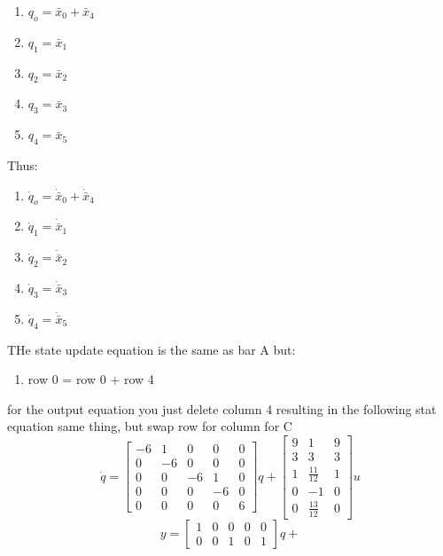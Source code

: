 \begin{enumerate}
\begin{enumerate}
      \begin{enumerate}
      \item \phantom{.} $q_o = \bar x_0 + \bar x_4$
      \item \phantom{.} $q_1 = \bar x_1$
      \item \phantom{.} $q_2 = \bar x_2$
      \item \phantom{.} $q_3 = \bar x_3$
      \item \phantom{.} $q_4 = \bar x_5$
      \end{enumerate}
      Thus:
      \begin{enumerate}
      \item \phantom{.} $\dot q_o = \dot \bar x_0 + \dot \bar x_4$
      \item \phantom{.} $\dot q_1 = \dot \bar x_1$
      \item \phantom{.} $\dot q_2 = \dot \bar x_2$
      \item \phantom{.} $\dot q_3 = \dot \bar x_3$
      \item \phantom{.} $\dot q_4 = \dot \bar x_5$
      \end{enumerate}
      THe state update equation is the same as bar A but:\\
      \begin{enumerate}
      \item row 0 = row 0 + row 4
      \end{enumerate}
      for the output equation you just delete column 4 resulting in the following stat equation
      same thing, but swap row for column for C
      \begin{equation}
        \dot q =
        \left[\begin{matrix}-6 & 1 & 0 & 0 & 0\\0 & -6 & 0 & 0 & 0\\0 & 0 & -6 & 1 & 0\\0 & 0 & 0 & -6 & 0\\0 & 0 & 0 & 0 & 6\end{matrix}\right]q +
        \left[\begin{matrix}9 & 1 & 9\\3 & 3 & 3\\1 & \frac{11}{12} & 1\\0 & -1 & 0\\0 & \frac{13}{12} & 0\end{matrix}\right] u
      \end{equation}
      \begin{equation}
        y =
        \left[\begin{matrix}1 & 0 & 0 & 0 & 0\\0 & 0 & 1 & 0 & 1\end{matrix}\right] q +

\end{equation}
\end{enumerate}
\end{enumerate}
